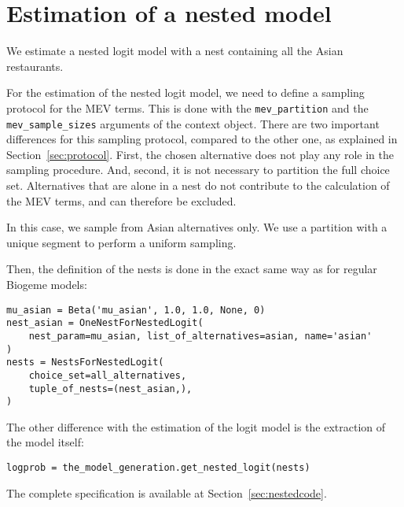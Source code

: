 \documentclass[12pt,a4paper]{article}
\begin{document}
\section{Estimation of a nested model}
\label{sec:nested}
We  estimate a nested logit model with a nest containing all the Asian restaurants.

For the estimation of the nested logit model, we need to define a
sampling protocol for the MEV terms. This is done with the
\lstinline+mev_partition+ and the \lstinline+mev_sample_sizes+
arguments of the context object. There are two important differences
for this sampling protocol, compared to the other one, as explained in
Section~\ref{sec:protocol}. First, the chosen alternative does not
play any role in the sampling procedure. And, second, it is not
necessary to partition the full choice set. Alternatives that are
alone in a nest do not contribute to the calculation of the MEV
terms, and can therefore be excluded.

In this case, we sample from Asian alternatives only. We use a partition with a unique segment to perform a uniform sampling. 

Then, the definition of the nests is done in the exact same way as for regular Biogeme models:
\begin{lstlisting}
mu_asian = Beta('mu_asian', 1.0, 1.0, None, 0)
nest_asian = OneNestForNestedLogit(
    nest_param=mu_asian, list_of_alternatives=asian, name='asian'
)
nests = NestsForNestedLogit(
    choice_set=all_alternatives,
    tuple_of_nests=(nest_asian,),
)
\end{lstlisting}

The other difference with the estimation of the logit model is the extraction of the model itself:
\begin{lstlisting}
logprob = the_model_generation.get_nested_logit(nests)
\end{lstlisting}
The complete specification is available at Section~\ref{sec:nestedcode}.
\end{document}
